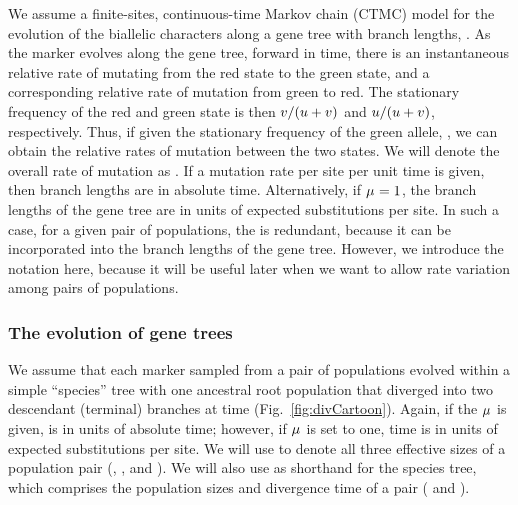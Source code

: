 We assume a finite-sites, continuous-time Markov chain (CTMC) model for the
evolution of the biallelic characters along a gene tree with branch lengths,
\genetree.
As the marker evolves along the gene tree, forward in time, there is an
instantaneous relative rate \rgmurate of mutating from the red state to the
green state, and a corresponding relative rate \grmurate of mutation from green
to red.
The stationary frequency of the red and green state is then
$v / (u + v)$
and
$u / (u + v)$, respectively.
Thus, if given the stationary frequency of the green allele, \gfreq, we can
obtain the relative rates of mutation between the two states.
We will denote the overall rate of mutation as \murate.
If a mutation rate per site per unit time is given, then branch lengths are in
absolute time.
Alternatively, if $\mu_{} = 1$, the branch lengths of the gene tree are in
units of expected substitutions per site.
In such a case, for a given pair of populations, the \murate is 
redundant, because it can be incorporated into the branch lengths of the gene
tree.
However, we introduce the notation here, because it will be useful later when
we want to allow rate variation among pairs of populations.

\subsubsection{The evolution of gene trees}

We assume that each marker sampled from a pair of populations evolved within a
simple ``species'' tree with one ancestral root population that diverged into
two descendant (terminal) branches at time \comparisondivtime
(Fig.~\ref{fig:divCartoon}).
Again, if the $\mu_{}$ is given, \comparisondivtime is in units of absolute
time; however, if $\mu_{}$ is set to one, time is in units of expected
substitutions per site.
We will use
\comparisonpopsizes{}
to denote all three
effective sizes of a population pair
(\epopsize[\rootpopindex],
\epopsize[\descendantpopindex{1}],
and \epopsize[\descendantpopindex{2}]).
We will also use
\sptree{}
as shorthand for the species tree, which comprises the population sizes and
divergence time of a pair
(\comparisonpopsizes{} and \comparisondivtime{}).

